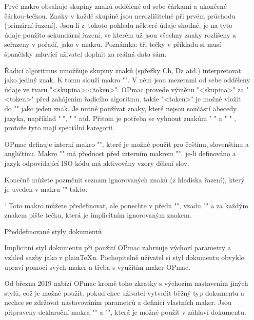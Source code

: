 \begtt
\def\sortingdataes {aAäÄáÁ,bB,cCçÇ,^^P^^Q^^R,dD,...,zZ,.}
\def\specsortingdataes {ch:^^P Ch:^^Q CH:^^R}
\endtt

Prvé makro obsahuje skupiny znaků oddělené od sebe čárkami a ukončené
čárkou-tečkou. Znaky v každé skupině jsou nerozlišitelné při prvém průchodu
(primární řazení). Jsou-li z~tohoto pohledu některé údaje shodné, je na tyto
údaje použito sekundární řazení, ve kterém už jsou všechny znaky rozlišeny a
seřazeny v pořadí, jako v makru. Poznámka: tři tečky v příkladu si musí španělsky
mluvící uživatel doplnit za reálná data sám.

Řadicí algoritmus umožňuje skupiny znaků (spřežky Ch, Dz atd.) interpretovat
jako jediný znak. K tomu slouží makro "". V něm
jsou mezerami od sebe odděleny údaje ve tvaru "<skupina>:<token>". OPmac
provede výměnu "<skupina>" za "<token>" před zahájením řadicího algoritmu,
takže "<token>" je možné vložit do "" jako jeden znak.
Je nutné používat znaky, které nejsou součástí abecedy jazyka, například
"^^A", "^^B" atd. Přitom je potřeba se vyhnout znakům "^^I" a "^^M" ,
protože tyto mají speciální kategorii.

OPmac definuje interní makro "\sortingdata", které
je možné použít pro češtinu, slovenštinu a angličtinu.
Makro "" má přednost před interním makrem
"\sortingdata", je-li definováno a jazyk odpovídající ISO kódu má
aktivovány vzory dělení slov.

Konečně můžete pozměnit seznam ignorovaných znaků (z hlediska řazení), který
je uveden v makru "\setignoredchars" takto:

{\catcode`
\begtt
\def\setignoredchars{\setlccodes ,.;.?.!.:.'.".|.(.).[.].<.>.=.+.{}{}}
\endtt
}%
Toto makro můžete předefinovat, ale ponechte v předu "\setlccodes", vzadu
"{}{}" a za každým znakem pište tečku, která je implicitním ignorovaným
znakem.

\maybebreak 4cm

\sec Předdefinované styly dokumentů

Implicitní styl dokumentu při použití OPmac zahrnuje výchozí parametry a
vzhled sazby
jako v plain\TeX u. Pochopitelně
uživatel si styl dokumentu obvykle upraví pomocí svých maker a třeba s
využitím maker OPmac.

Od března 2019 nabízí OPmac kromě toho zkratky s výchozím nastavením jiných
stylů, což je možné použít, pokud chce uživatel vytvořit
běžný typ dokumentu a nechce se zdržovat nastavováním parametrů a
definicí vlastních maker. Jsou připraveny deklarační makra "\report" a 
"", která je možné použít v záhlaví dokumentu.

